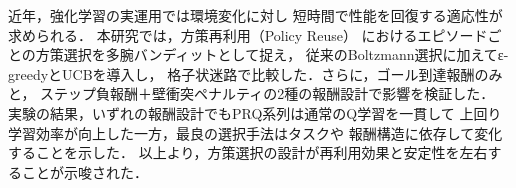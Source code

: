 近年，強化学習の実運用では環境変化に対し
短時間で性能を回復する適応性が求められる．
本研究では，方策再利用（Policy Reuse）
におけるエピソードごとの方策選択を多腕バンディットとして捉え，
従来のBoltzmann選択に加えてε-greedyとUCBを導入し，
格子状迷路で比較した．さらに，ゴール到達報酬のみと，
ステップ負報酬＋壁衝突ペナルティの2種の報酬設計で影響を検証した．
実験の結果，いずれの報酬設計でもPRQ系列は通常のQ学習を一貫して
上回り学習効率が向上した一方，最良の選択手法はタスクや
報酬構造に依存して変化することを示した．
以上より，方策選択の設計が再利用効果と安定性を左右することが示唆された．
